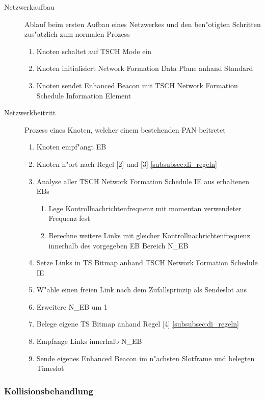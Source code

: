 \begin{description}
  \item [Netzwerkaufbau] Ablauf beim ersten Aufbau eines Netzwerkes und den
  ben"otigten Schritten zus"atzlich zum normalen Prozess
  \begin{enumerate}
    \item Knoten schaltet auf TSCH Mode ein
    \item Knoten initialisiert Network Formation Data Plane anhand Standard
    \item Knoten sendet Enhanced Beacon mit TSCH Network Formation Schedule Information Element
  \end{enumerate}

  \item [Netzwerkbeitritt] Prozess eines Knoten, welcher einem bestehenden
  PAN beitretet
  \begin{enumerate}
    \item Knoten empf"angt EB
    \item Knoten h"ort nach Regel [2] und [3] \ref{subsubsec:di_regeln}
    \item Analyse aller TSCH Network Formation Schedule IE aus erhaltenen EBs
    \begin{enumerate}
      \item Lege Kontrollnachrichtenfrequenz mit momentan verwendeter Frequenz fest
      \item Berechne weitere Links mit gleicher Kontrollnachrichtenfrequenz
      innerhalb des vorgegeben EB Bereich N\_EB
    \end{enumerate}
    \item Setze Links in TS Bitmap anhand TSCH Network Formation Schedule IE
    \item W"ahle einen freien Link nach dem Zufallsprinzip als Sendeslot aus
    \item Erweitere N\_EB um 1
    \item Belege eigene TS Bitmap anhand Regel [4] \ref{subsubsec:di_regeln}
    \item Empfange Links innerhalb N\_EB
    \item Sende eigenes Enhanced Beacon im n"achsten Slotframe und belegten Timeslot
  \end{enumerate}
\end{description}

\subsubsection{Kollisionsbehandlung}
\label{subsubsec:di_kollisionsbehandlung}

